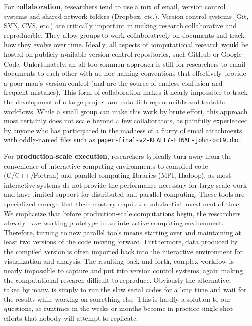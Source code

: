 \documentclass[ChapterTOCs,krantz2]{krantz} %
\begin{document}
For \textbf{collaboration}, researchers tend to use a mix of email, version
control systems and shared network folders (Dropbox, etc.).  Version control
systems (Git, SVN, CVS, etc.) are critically important in making research
collaborative and reproducible. They allow groups to work collaboratively on
documents and track how they evolve over time. Ideally, all aspects of
computational research would be hosted on publicly available version control
repositories, such GitHub or Google Code. Unfortunately, an all-too common
approach is still for researchers to email documents to each other with ad-hoc
naming conventions that effectively provide a poor man's version control (and
are the source of endless confusion and frequent mistakes). This form of
collaboration makes it nearly impossible to track the development of a large
project and establish reproducible and testable workflows.  While a small group
can make this work by brute effort, this approach most certainly does not scale
beyond a few collaborators, as painfully experienced by anyone who has
participated in the madness of a flurry of email attachments with oddly-named
files such as {\tt paper-final-v2-REALLY-FINAL-john-oct9.doc}.

For \textbf{production-scale execution}, researchers typically turn away from
the convenience of interactive computing environments to compiled code
(C/C++/Fortran) and parallel computing libraries (MPI, Hadoop), as most
interactive systems do not provide the performance necessary for large-scale
work and have limited support for distributed and parallel computing.  These
tools are specialized enough that their mastery requires a substantial
investment of time. We emphasize that before production-scale computations
begin, the researchers already have working prototype in an interactive
computing environment. Therefore, turning to new parallel tools means starting
over and maintaining at least two versions of the code moving
forward. Furthermore, data produced by the compiled version is often imported
back into the interactive environment for visualization and analysis. The
resulting back-and-forth, complex workflow is nearly impossible to capture and
put into version control systems, again making the computational research
difficult to reproduce.  Obviously the alternative, taken by many, is simply to
run the slow serial codes for a long time and wait for the results while
working on something else.  This is hardly a solution to our questions, as
runtimes in the weeks or months become in practice single-shot efforts that
nobody will attempt to replicate.
\end{document}
